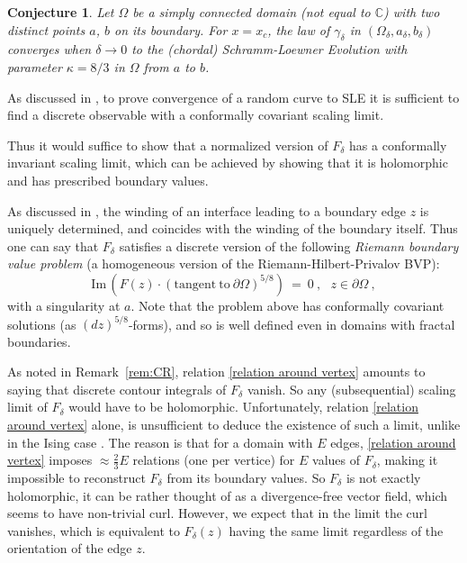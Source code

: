 \documentclass[a4paper,oneside,12pt]{article}
\newtheorem{conjecture}{Conjecture}
\begin{document}
\begin{conjecture}\label{SLE}
Let $\Omega$ be a simply connected domain (not equal to $\mathbb C$) with two distinct points $a$, $b$ on its boundary. For $x=x_c$, the law of $\gamma_\delta$ in $(\Omega_\delta,a_\delta,b_\delta)$ converges when $\delta\rightarrow 0$ to the (chordal) Schramm-Loewner Evolution with parameter $\kappa=8/3$ in $\Omega$ from $a$ to $b$.
\end{conjecture}


As discussed in \cite{lsw-ust,Smirnov}, to prove convergence of a random curve to SLE
it is sufficient to find a discrete observable
with a conformally covariant scaling limit.

Thus it would suffice to show that a normalized version of $F_\delta$
has a conformally invariant scaling limit,
which can be achieved by showing that it is holomorphic
and has prescribed boundary values.

As discussed in \cite{smirnov-icm2010}, the winding of an interface leading to
a boundary edge $z$ is uniquely determined, and coincides with the winding of the boundary
itself.
Thus one can say that $F_\delta$ satisfies a discrete version of the following
\emph{Riemann boundary value problem}
(a homogeneous version of the Riemann-Hilbert-Privalov BVP):
\begin{equation}
{\mathrm{Im}}\,\left({F(z)\cdot\left({\mathrm{tangent~to~}\partial\Omega}\right)^{5/8}}\right)~=~0~,~~~z\in\partial\Omega~,
\label{eq:rbvp}\end{equation}
with a singularity at $a$.
Note that the problem above has conformally covariant solutions
(as  $(dz)^{5/8}$-forms),
and so is well defined even in domains with fractal boundaries.

As noted in Remark~\ref{rem:CR}, relation \eqref{relation around vertex}
amounts to saying that discrete contour integrals of $F_\delta$ vanish.
So any (subsequential) scaling limit of $F_\delta$ would have to be holomorphic.
Unfortunately, relation \eqref{relation around vertex} alone, is unsufficient to
deduce the existence of such a limit, unlike in the Ising case \cite{chelkak-smirnov-iso}.
The reason is that for a domain with $E$ edges, \eqref{relation around vertex} imposes
$\approx \frac23 E$ relations (one per vertice) for $E$ values of $F_\delta$,
making it impossible to reconstruct $F_\delta$ from its boundary values.
So $F_\delta$ is not exactly holomorphic, it can be rather thought of as a divergence-free
vector field, which seems to have non-trivial curl.
However, we expect that in the limit the curl vanishes, which is equivalent to
$F_\delta(z)$ having the same limit regardless of the orientation of the edge $z$.
\end{document}
